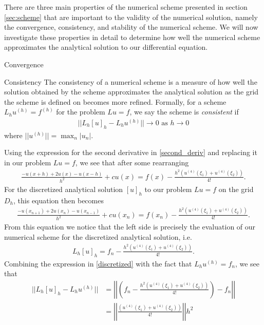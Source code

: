 There are three main properties of the numerical scheme presented in section
\ref{sec:scheme} that are important to the validity of the numerical solution,
namely the convergence, consistency, and stability of the numerical scheme.
We will now investigate these properties in detail to determine how well
the numerical scheme approximates the analytical solution to our differential
equation.

\begin{subsection}{Convergence}
\end{subsection}

\begin{subsection}{Consistency}
  The consistency of a numerical scheme is a measure of how well the solution
  obtained by the scheme approximates the analytical solution as the grid
  the scheme is defined on becomes more refined. Formally,
  for a scheme $L_h u^{(h)} = f^{(h)}$ for the problem $Lu = f$, we say the
  scheme is \textit{consistent} if
  \begin{align}\label{consistency}
    ||L_h[u]_h - L_h u^{(h)}|| \to 0 \text{\ as $h \to 0$}
  \end{align}
  where $|| u^{(h)} || = \max_n |u_n|$.

  Using the expression for the second
  derivative in \eqref{second_deriv} and replacing it in our problem $Lu = f$, we
  see that after some rearranging
  \begin{align*}
    \frac{-u(x + h) + 2u(x) - u(x-h)}{h^2} + cu(x) = f(x) - \frac{h^2(u^{(4)}(\xi_1) + u^{(4)}(\xi_2))}{4!}.
  \end{align*}
  For the discretized analytical solution $[u]_h$ to our problem $Lu = f$ on the grid $D_h$,
  this equation then becomes
  \begin{align*}
    \frac{-u(x_{n+1}) + 2u(x_n) - u(x_{n-1})}{h^2} + cu(x_n) = f(x_n) - \frac{h^2(u^{(4)}(\xi_1) + u^{(4)}(\xi_2))}{4!}.
  \end{align*}
  From this equation we notice that the left side is precisely the evaluation
  of our numerical scheme for the discretized analytical solution, i.e.
  \begin{align}\label{discretized}
    L_h[u]_h = f_n - \frac{h^2(u^{(4)}(\xi_1) + u^{(4)}(\xi_2))}{4!}.
  \end{align}
  Combining the expression in \eqref{discretized} with the fact that
  $L_hu^{(h)} = f_n$, we see that
  \begin{align*}
    ||L_h[u]_h - L_hu^{(h)}||
    &= \left|\left| \left(f_n - \frac{h^2(u^{(4)}(\xi_1) + u^{(4)}(\xi_2))}{4!}\right) - f_n \right|\right| \\
    &= \left|\left| \frac{(u^{(4)}(\xi_1) + u^{(4)}(\xi_2))}{4!}\right|\right| h^2
  \end{align*}


\end{subsection}
